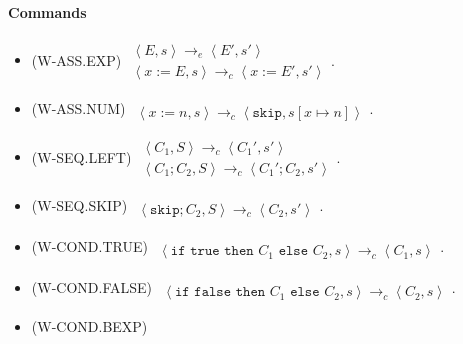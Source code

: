 \documentclass[twocolumn,english]{article}
\begin{document}
\paragraph{Commands}
\begin{itemize}
\item {\scriptsize{}(W-ASS.EXP)} $\begin{array}{c}
\left\langle E,s\right\rangle \rightarrow_{e}\left\langle E',s'\right\rangle \\
\hline \left\langle x:=E,s\right\rangle \rightarrow_{c}\left\langle x:=E',s'\right\rangle 
\end{array}$.
\item {\scriptsize{}(W-ASS.NUM)} $\begin{array}{c}
\\
\hline \left\langle x:=n,s\right\rangle \rightarrow_{c}\left\langle \texttt{skip},s\left[x\mapsto n\right]\right\rangle 
\end{array}$.
\item {\scriptsize{}(W-SEQ.LEFT)} $\begin{array}{c}
\left\langle C_{1},S\right\rangle \rightarrow_{c}\left\langle C_{1}',s'\right\rangle \\
\hline \left\langle C_{1};C_{2},S\right\rangle \rightarrow_{c}\left\langle C_{1}';C_{2},s'\right\rangle 
\end{array}$.
\item {\scriptsize{}(W-SEQ.SKIP)} $\begin{array}{c}
\\
\hline \left\langle \texttt{skip};C_{2},S\right\rangle \rightarrow_{c}\left\langle C_{2},s'\right\rangle 
\end{array}$.
\item {\scriptsize{}(W-COND.TRUE)} $\begin{array}{c}
\\
\hline \left\langle \texttt{if true then }C_{1}\texttt{ else }C_{2},s\right\rangle \rightarrow_{c}\left\langle C_{1},s\right\rangle 
\end{array}$.
\item {\scriptsize{}(W-COND.FALSE)} $\begin{array}{c}
\\
\hline \left\langle \texttt{if false then }C_{1}\texttt{ else }C_{2},s\right\rangle \rightarrow_{c}\left\langle C_{2},s\right\rangle 
\end{array}$.
\item {\scriptsize{}(W-COND.BEXP)} 
\begin{multline*}
\begin{array}{c}

\end{array}
\end{multline*}
\end{itemize}
\end{document}
